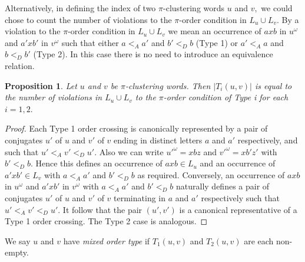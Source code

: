 \documentclass[12pt,a4paper]{amsart}
\newtheorem{proposition}{Proposition}
\begin{document}
Alternatively, in defining the index of two $\pi$-clustering words $u$ and $v,$ we could chose to count the number of violations to the $\pi$-order condition in  $L_u\cup L_v.$
By a violation to the $\pi$-order condition in $L_u\cup L_v$ we mean an occurrence of $axb$ in $u^\omega$ and $a'xb'$ in $v^\omega$ such that either $a<_A a'$ and $b'<_D b$ (Type 1) or $a'<_A a$ and $b <_D b'$ (Type 2). In this case there is no need to introduce an equivalence relation. 

\begin{proposition} Let $u$ and $v$ be $\pi$-clustering words. Then $|T_i(u,v)|$ is equal to the number of violations in $L_u\cup L_v$ to the $\pi$-order condition of Type i for each $i=1,2.$  
\end{proposition} 

\begin{proof} Each Type 1 order crossing is canonically represented by a pair of conjugates $u'$ of $u$ and $v'$ of $v$ ending in distinct letters $a$ and $a'$ respectively, and such that $u'<_A v'<_D u'.$ 
Also we can write $u'^\omega =xbz$ and $v'^\omega=xb'z'$ with $b'<_Db.$ Hence this defines an occurrence of $axb\in L_u$ and an occurrence of $a'xb'\in L_v$ with $a<_A a'$ and $b'<_D b$ as required. Conversely, 
an occurrence of $axb$ in $u^\omega$ and $a'xb'$ in $v^\omega$ with $a<_A a'$ and $b'<_D b$ naturally defines a pair of conjugates $u'$ of $u$ and $v'$ of $v$ terminating in $a$ and $a'$ respectively such that $u'<_A v'<_D u'.$ It follow that the pair $(u',v')$ is a canonical representative of a Type 1 order crossing. The Type 2 case is analogous. \end{proof} 



We say $u$ and $v$ have {\it mixed order type} if $T_1(u,v)$ and $T_2(u,v)$ are each non-empty.  
\end{document}
